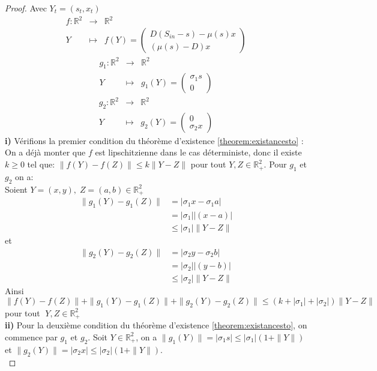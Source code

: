 \documentclass[12pt,a4paper]{report}%
\begin{document}
\begin{proof}
	Avec \( Y_t = (s_t, x_t) \)
	$$
	\begin{array}{rcl}
		f:\mathbb{R}^2 &\to& \mathbb{R}^2\\
		Y &\mapsto &f(Y)=\begin{pmatrix}
			D(S_{in}-s) - \mu(s)x \\
			(\mu(s)-D)x
		\end{pmatrix}
	\end{array}
	$$
	$$
	\begin{array}{rcl}
		g_1:\mathbb{R}^2 &\to& \mathbb{R}^2\\
		Y &\mapsto &g_1(Y)=\begin{pmatrix}
			\sigma_1 s \\
			0
		\end{pmatrix}
	\end{array}
	$$
	$$
	\begin{array}{rcl}
		g_2:\mathbb{R}^2 &\to& \mathbb{R}^2\\
		Y &\mapsto &g_2(Y)=\begin{pmatrix}
			0\\
			\sigma_2 x 
		\end{pmatrix}
	\end{array}
	$$
	{\bf i)} Vérifions la premier condition du théorème d'existence \ref{theorem:existancesto} :\\
	On a déjà monter que $f$ est lipschitzienne dans le cas déterministe, donc il existe $k\geqslant 0$ tel que: $\|f(Y)-f(Z)\| \leq k \|Y-Z\|$ pour tout $Y,Z \in \mathbb{R}^2_+$.
	Pour $g_1$ et $g_2$ on a:\\
	Soient $Y=(x,y), \;Z=(a, b) \in \mathbb{R}^2_+$ 
	$$ 
	\begin{aligned}
		\|g_1(Y)-g_1(Z)\|&=|\sigma_1 x -\sigma_1 a|\\
		&=|\sigma_1| | (x -a)|\\
		&\leq |\sigma_1| \|Y-Z\|
	\end{aligned}
	$$
	et $$ 
	\begin{aligned}
		\|g_2(Y)-g_2(Z)\|&=|\sigma_2 y -\sigma_2 b|\\
		&=|\sigma_2| | (y -b)|\\
		&\leq |\sigma_2| \|Y-Z\|
	\end{aligned}
	$$
	Ainsi 
	$$
	\|f(Y)-f(Z)\|+\|g_1(Y)-g_1(Z)\|+\|g_2(Y)-g_2(Z)\|\leq (k+|\sigma_1|+|\sigma_2|) \|Y-Z\| 
	$$
	pour tout $\;Y,Z \in \mathbb{R}^2_+$\\
	{\bf ii)} Pour la deuxième condition du théorème d'existence \ref{theorem:existancesto}, on commence par \( g_1 \) et \( g_2 \). Soit \( Y \in \mathbb{R}^2_+ \), on a \(\|g_1(Y)\| = |\sigma_1 s| \leqslant |\sigma_1|(1 + \|Y\|)\) et \(\|g_2(Y)\| = |\sigma_2 x| \leqslant |\sigma_2|(1 + \|Y\|)\).\\

\end{proof}
\end{document}
